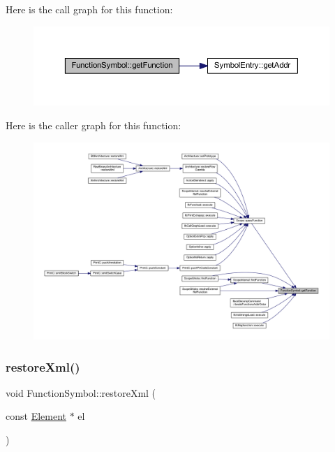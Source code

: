 Here is the call graph for this function\+:
\nopagebreak
\begin{figure}[H]
\begin{center}
\leavevmode
\includegraphics[width=350pt]{class_function_symbol_ab54ed780e0dd1abdc9447c2e772114fb_cgraph}
\end{center}
\end{figure}
Here is the caller graph for this function\+:
\nopagebreak
\begin{figure}[H]
\begin{center}
\leavevmode
\includegraphics[width=350pt]{class_function_symbol_ab54ed780e0dd1abdc9447c2e772114fb_icgraph}
\end{center}
\end{figure}
\mbox{\label{class_function_symbol_afba4e81eed1ad378ae7f0531ec8f3d2b}} 
\subsubsection{\texorpdfstring{restoreXml()}{restoreXml()}}
{\footnotesize\ttfamily void Function\+Symbol\+::restore\+Xml (\begin{DoxyParamCaption}\item[{const \mbox{\hyperlink{class_element}{Element}} $\ast$}]{el }\end{DoxyParamCaption})\hspace{0.3cm}{\ttfamily [virtual]}}



